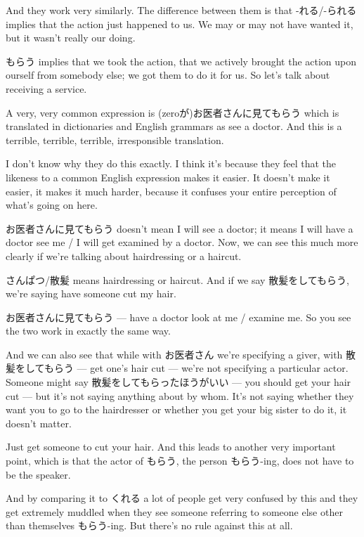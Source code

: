 {}

And they work very similarly. The difference between them is that -れる/-られる implies that the action just happened to us. We may or may not have wanted it, but it wasn't really our doing.

もらう implies that we took the action, that we actively brought the action upon ourself from somebody else; we got them to do it for us. So let's talk about receiving a service.

A very, very common expression is (zeroが)お医者さんに見てもらう which is translated in dictionaries and English grammars as see a doctor. And this is a terrible, terrible, terrible, irresponsible translation.

{}

I don't know why they do this exactly. I think it's because they feel that the likeness to a common English expression makes it easier. It doesn't make it easier, it makes it much harder, because it confuses your entire perception of what's going on here.

お医者さんに見てもらう doesn't mean I will see a doctor; it means I will have a doctor see me / I will get examined by a doctor. Now, we can see this much more clearly if we're talking about hairdressing or a haircut.

さんぱつ/散髪 means hairdressing or haircut. And if we say 散髪をしてもらう, we're saying have someone cut my hair.

{}

お医者さんに見てもらう --- have a doctor look at me / examine me. So you see the two work in exactly the same way.

And we can also see that while with お医者さん we're specifying a giver, with 散髪をしてもらう --- get one's hair cut --- we're not specifying a particular actor. Someone might say 散髪をしてもらったほうがいい --- you should get your hair cut --- but it's not saying anything about by whom. It's not saying whether they want you to go to the hairdresser or whether you get your big sister to do it, it doesn't matter.

Just get someone to cut your hair. And this leads to another very important point, which is that the actor of もらう, the person もらう-ing, does not have to be the speaker.

And by comparing it to くれる a lot of people get very confused by this and they get extremely muddled when they see someone referring to someone else other than themselves もらう-ing. But there's no rule against this at all.

